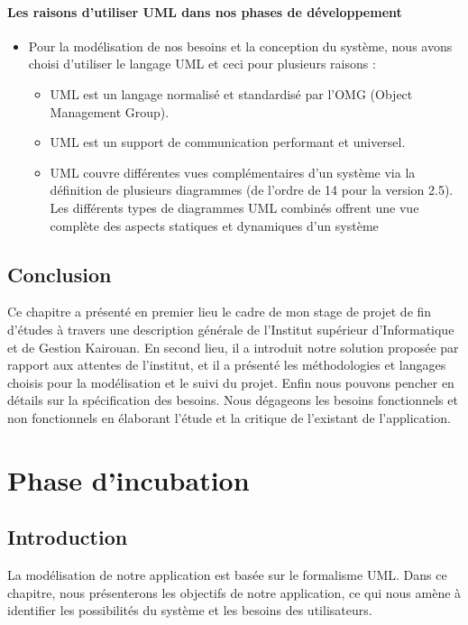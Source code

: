 \documentclass[12 pt]{report}
\begin{document}
\subsubsection{	Les raisons d’utiliser UML dans nos phases de développement }
\begin{itemize}[font=\color{black} \Large, label=]

\item Pour la modélisation de nos besoins et la conception du système, nous avons choisi d’utiliser le langage UML et ceci pour plusieurs raisons :
\begin{itemize}[font=\color{black} \Large, label=]

	\item UML est un langage normalisé et standardisé par l’OMG (Object Management Group).
	\item UML est un support de communication performant et universel.
	\item UML couvre différentes vues complémentaires d’un système via la définition de plusieurs diagrammes (de l’ordre de 14 pour la version 2.5). Les différents types de diagrammes UML combinés offrent une vue complète des aspects statiques et dynamiques d’un système
\end{itemize}
\end{itemize}
\section*{Conclusion}  


Ce chapitre a présenté en premier lieu le cadre de mon stage de projet de fin d’études à travers une description générale de l’Institut supérieur d’Informatique et de Gestion Kairouan. En second lieu, il a introduit notre solution proposée par rapport aux attentes de l’institut, et il a présenté les méthodologies et langages choisis pour la modélisation et le suivi du projet. Enfin nous pouvons pencher en détails sur la spécification des besoins. Nous dégageons les besoins fonctionnels et non fonctionnels en élaborant l’étude et la critique de l’existant de l’application. 

\chapter{Phase d’incubation}
\section*{Introduction}  
La modélisation de notre application est basée sur le formalisme UML. Dans ce chapitre, nous présenterons les objectifs de notre application, ce qui nous amène à identifier les possibilités du système et les besoins des utilisateurs.
\end{document}
